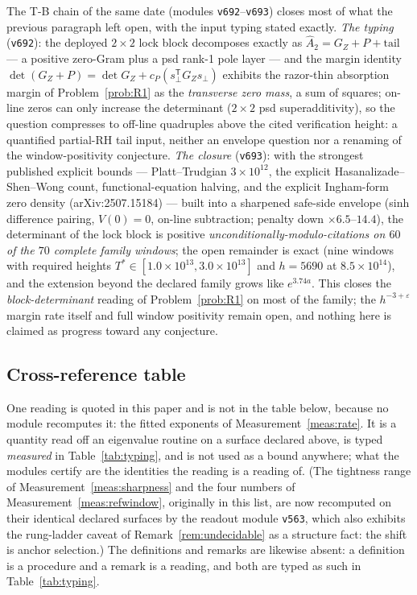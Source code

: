 \documentclass[11pt,a4paper]{article}
\theoremstyle{plain}
\theoremstyle{definition}
\begin{document}
The T-B chain of the same date (modules \texttt{v692}--\texttt{v693})
closes most of what the previous paragraph left open, with the input
typing stated exactly.  \emph{The typing} (\texttt{v692}): the deployed
$2\times2$ lock block decomposes exactly as $\hat
A_2=G_Z+P+\mathrm{tail}$ --- a positive zero-Gram plus a psd rank-1
pole layer --- and the margin identity $\det(G_Z+P)=\det
G_Z+c_P(s_\perp^{\mathsf T}G_Zs_\perp)$ exhibits the razor-thin
absorption margin of Problem~\ref{prob:R1} as the \emph{transverse
zero mass}, a sum of squares; on-line zeros can only increase the
determinant ($2\times2$ psd superadditivity), so the question
compresses to off-line quadruples above the cited verification
height: a quantified partial-RH tail input, neither an envelope
question nor a renaming of the window-positivity conjecture.
\emph{The closure} (\texttt{v693}): with the strongest published
explicit bounds --- Platt--Trudgian $3\times10^{12}$, the explicit
Hasanalizade--Shen--Wong count, functional-equation halving, and the
explicit Ingham-form zero density (arXiv:2507.15184) --- built into a
sharpened safe-side envelope (sinh difference pairing, $V(0)=0$,
on-line subtraction; penalty down $\times6.5$--$14.4$), the
determinant of the lock block is positive
\emph{unconditionally-modulo-citations on $60$ of the $70$ complete
family windows}; the open remainder is exact (nine windows with
required heights $T^*\in[1.0\times10^{13},3.0\times10^{13}]$ and
$h=5690$ at $8.5\times10^{14}$), and the extension beyond the
declared family grows like $e^{3.74a}$.  This closes the
\emph{block-determinant} reading of Problem~\ref{prob:R1} on most of
the family; the $h^{-3+\varepsilon}$ margin rate itself and full
window positivity remain open, and nothing here is claimed as
progress toward any conjecture.

\subsection{Cross-reference table}
\label{sec:crossref}

One reading is quoted in this paper and is not in the table below, because no
module recomputes it: the fitted exponents of Measurement~\ref{meas:rate}. It is
a quantity read off an eigenvalue routine on a surface declared above, is typed
\emph{measured} in Table~\ref{tab:typing}, and is not used as a bound anywhere;
what the modules certify are the identities the reading is a reading of. (The
tightness range of Measurement~\ref{meas:sharpness} and the four numbers of
Measurement~\ref{meas:refwindow}, originally in this list, are now recomputed on
their identical declared surfaces by the readout module \texttt{v563}, which
also exhibits the rung-ladder caveat of Remark~\ref{rem:undecidable} as a
structure fact: the shift is anchor selection.) The definitions and
remarks are likewise absent: a definition is a procedure and a remark is a
reading, and both are typed as such in Table~\ref{tab:typing}.
\end{document}
